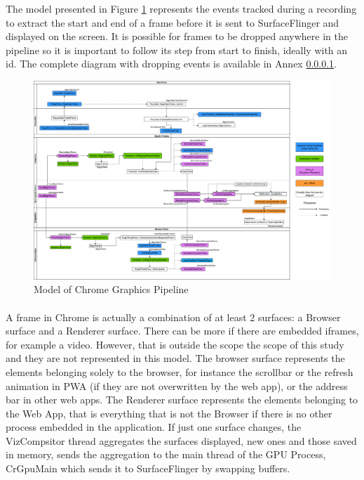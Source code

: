 \documentclass{kththesis}
\begin{document}
The model presented in Figure \ref{fig:chrome_graphics_simple} represents the events tracked during a recording to extract the start and end of a frame before it is sent to SurfaceFlinger and displayed on the screen. It is possible for frames to be dropped anywhere in the pipeline so it is important to follow its step from start to finish, ideally with an id. The complete diagram with dropping events is available in Annex \ref{}.

\begin{figure}[!ht]
    \centering
    \includegraphics[width=15cm]{kththesis/Figures/Chrome_graphics_simple.png}
    \caption{Model of Chrome Graphics Pipeline}
    \label{fig:chrome_graphics_simple}
\end{figure}
        
 \paragraph{}
A frame in Chrome is actually a combination of at least 2 surfaces: a Browser surface and a Renderer surface. There can be more if there are embedded iframes, for example a video. However, that is outside the scope the scope of this study and they are not represented in this model. The browser surface represents the elements belonging solely to the browser, for instance the scrollbar or the refresh animation in PWA (if they are not overwritten by the web app), or the address bar in other web apps. The Renderer surface represents the elements belonging to the Web App, that is everything that is not the Browser if there is no other process embedded in the application. If just one surface changes, the VizCompsitor thread aggregates the surfaces displayed, new ones and those saved in memory, sends the aggregation to the main thread of the GPU Process, CrGpuMain which sends it to SurfaceFlinger by swapping buffers. 
\end{document}
